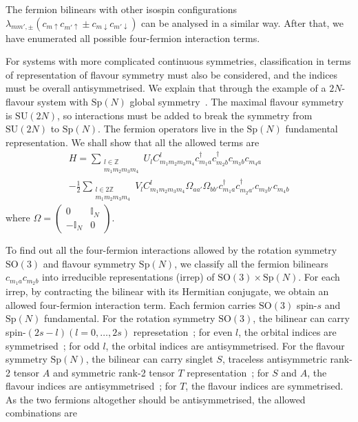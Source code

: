 \documentclass{timesjhep}
\begin{document}
The fermion bilinears with other isospin configurations $\lambda_{mm',\pm}(c_{m\uparrow}c_{m'\uparrow}\pm c_{m\downarrow}c_{m'\downarrow})$ can be analysed in a similar way. After that, we have enumerated all possible four-fermion interaction terms. 

For systems with more complicated continuous symmetries, classification in terms of representation of flavour symmetry must also be considered, and the indices must be overall antisymmetrised. We explain that through the example of a $2N$-flavour system with $\mathrm{Sp}(N)$ global symmetry~\cite{}. The maximal flavour symmetry is $\mathrm{SU}(2N)$, so interactions must be added to break the symmetry from $\mathrm{SU}(2N)$ to $\mathrm{Sp}(N)$. The fermion operators live in the $\mathrm{Sp}(N)$ fundamental representation. We shall show that all the allowed terms are 
\begin{multline}
    H=\sum_{\substack{l\in\mathbb{Z}\\m_1m_2m_3m_4}}U_lC^l_{m_1m_2m_3m_4}c^\dagger_{m_1a}c^\dagger_{m_2b}c_{m_3b}c_{m_4a}\\
    -\frac{1}{2}\sum_{\substack{l\in 2\mathbb{Z}\\m_1m_2m_3m_4}}V_lC^l_{m_1m_2m_3m_4}\Omega_{aa'}\Omega_{bb'}c^\dagger_{m_1a}c^\dagger_{m_2a'}c_{m_3b'}c_{m_4b} 
\end{multline} 
where $\Omega=\begin{pmatrix}0&\mathbb{I}_N\\-\mathbb{I}_N&0\end{pmatrix}$. 

To find out all the four-fermion interactions allowed by the rotation symmetry $\mathrm{SO}(3)$ and flavour symmetry $\mathrm{Sp}(N)$, we classify all the fermion bilinears $c_{m_1a}c_{m_2b}$ into irreducible representations (irrep) of $\mathrm{SO}(3)\times\mathrm{Sp}(N)$. For each irrep, by contracting the bilinear with its Hermitian conjugate, we obtain an allowed four-fermion interaction term. Each fermion carries $\mathrm{SO}(3)$ spin-$s$ and $\mathrm{Sp}(N)$ fundamental. For the rotation symmetry $\mathrm{SO}(3)$, the bilinear can carry spin-$(2s-l)(l=0,\dots,2s)$ represetation~; for even $l$, the orbital indices are symmetrised~; for odd $l$, the orbital indices are antisymmetrised. For the flavour symmetry $\mathrm{Sp}(N)$, the bilinear can carry singlet $S$, traceless antisymmetric rank-2 tensor $A$ and symmetric rank-2 tensor $T$ representation~; for $S$ and $A$, the flavour indices are antisymmetrised~; for $T$, the flavour indices are symmetrised. As the two fermions altogether should be antisymmetrised, the allowed combinations are 
\end{document}
